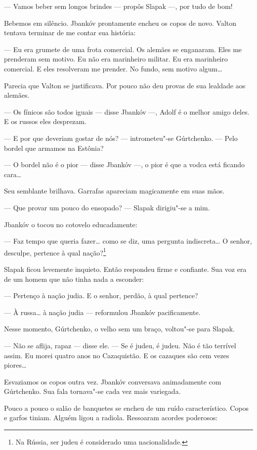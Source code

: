 --- Vamos beber sem longos brindes --- propôs Slapak ---, por tudo de
bom!

Bebemos em silêncio. Jbankóv prontamente encheu os copos de novo. Valton
tentava terminar de me contar sua história:

--- Eu era grumete de uma frota comercial. Os alemães se enganaram. Eles
me prenderam sem motivo. Eu não era marinheiro militar. Eu era
marinheiro comercial. E eles resolveram me prender. No fundo, sem motivo
algum\ldots{}

Parecia que Valton se justificava. Por pouco não deu provas de sua
lealdade aos alemães.

--- Os fínicos são todos iguais --- disse Jbankóv ---, Adolf é o melhor
amigo deles. E os russos eles desprezam.

--- E por que deveriam gostar de nós? --- intrometeu"-se Gúrtchenko. ---
Pelo bordel que armamos na Estônia?

--- O bordel não é o pior --- disse Jbankóv ---, o pior é que a vodca
está ficando cara\ldots{}

Seu semblante brilhava. Garrafas apareciam magicamente em suas mãos.

--- Que provar um pouco do ensopado? --- Slapak dirigiu"-se a mim.

Jbankóv o tocou no cotovelo educadamente:

--- Faz tempo que queria fazer\ldots{} como se diz, uma pergunta
indiscreta\ldots{} O senhor, desculpe, pertence à qual nação?\footnote{Na
  Rússia, ser judeu é considerado uma nacionalidade.}

Slapak ficou levemente inquieto. Então respondeu firme e confiante. Sua
voz era de um homem que não tinha nada a esconder:

--- Pertenço à nação judia. E o senhor, perdão, à qual pertence?

--- À russa\ldots{} à nação judia --- reformulou Jbankóv pacificamente.

Nesse momento, Gúrtchenko, o velho sem um braço, voltou"-se para Slapak.

--- Não se aflija, rapaz --- disse ele. --- Se é judeu, é judeu. Não é
tão terrível assim. Eu morei quatro anos no Cazaquistão. E os cazaques
são cem vezes piores\ldots{}

Esvaziamos os copos outra vez. Jbankóv conversava animadamente com
Gúrtchenko. Sua fala tornava"-se cada vez mais variegada.

Pouco a pouco o salão de banquetes se encheu de um ruído característico.
Copos e garfos tiniam. Alguém ligou a radiola. Ressoaram acordes
poderosos:

